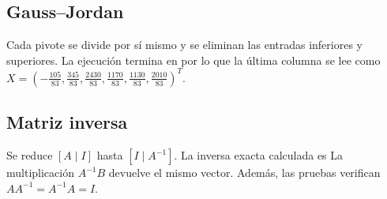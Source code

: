 \documentclass[conference]{IEEEtran}
\begin{document}
\subsection{Gauss--Jordan}
Cada pivote se divide por sí mismo y se eliminan las entradas inferiores y superiores. La ejecución termina en
por lo que la última columna se lee como $X=\left(-\frac{105}{83},\frac{345}{83},\frac{2430}{83},\frac{1170}{83},\frac{1130}{83},\frac{2010}{83}\right)^T$.

\subsection{Matriz inversa}
Se reduce $[A\mid I]$ hasta $[I\mid A^{-1}]$. La inversa exacta calculada es
La multiplicación $A^{-1}B$ devuelve el mismo vector. Además, las pruebas verifican $AA^{-1}=A^{-1}A=I$.
\end{document}
